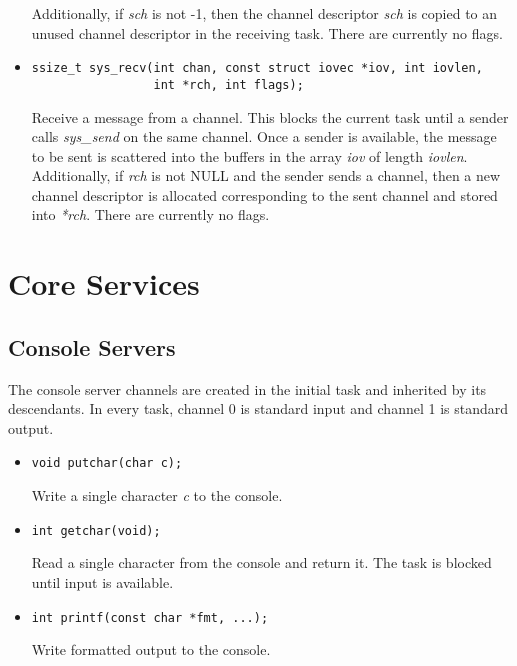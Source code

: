 \documentclass[letterpaper]{article}
\begin{document}
\begin{itemize}
	Additionally, if \emph{sch} is not -1, then the channel descriptor \emph{sch}
	is copied to an unused channel descriptor in the receiving task. There are currently no flags.

\item \begin{verbatim}
ssize_t sys_recv(int chan, const struct iovec *iov, int iovlen,
                 int *rch, int flags);\end{verbatim}
	Receive a message from a channel. This blocks the current task until a sender calls \emph{sys\_send} on the
	same channel. Once a sender is available, the message to be sent is scattered into the buffers in the array
	\emph{iov} of length \emph{iovlen}. Additionally, if \emph{rch} is not NULL and the sender sends a channel,
        then a new channel descriptor is allocated corresponding to the sent channel and stored into \emph{*rch}.
	There are currently no flags.


\end{itemize}
\section{Core Services}
\subsection{Console Servers}
The console server channels are created in the initial task and inherited
by its descendants. In every task, channel 0 is standard input and
channel 1 is standard output.
\begin{itemize}
\item \begin{verbatim}void putchar(char c);\end{verbatim}
Write a single character \emph{c} to the console.
\item \begin{verbatim}int getchar(void);\end{verbatim}
Read a single character from the console and return it.
The task is blocked until input is available.
\item \begin{verbatim}int printf(const char *fmt, ...);\end{verbatim}
Write formatted output to the console.
\end{itemize}
\end{document}
